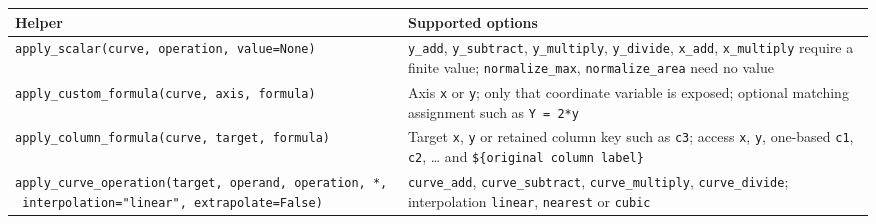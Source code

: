 \documentclass[
  10pt,
  a4paper,
  oneside]{scrreprt}
\begin{document}
\begin{longtable}[]{@{}ll@{}}
\toprule
\begin{minipage}[b]{0.47\columnwidth}\raggedright
Helper\strut
\end{minipage} & \begin{minipage}[b]{0.47\columnwidth}\raggedright
Supported options\strut
\end{minipage}\tabularnewline
\midrule
\endhead
\begin{minipage}[t]{0.47\columnwidth}\raggedright
\texttt{apply\_scalar(curve,\ operation,\ value=None)}\strut
\end{minipage} & \begin{minipage}[t]{0.47\columnwidth}\raggedright
\texttt{y\_add}, \texttt{y\_subtract}, \texttt{y\_multiply},
\texttt{y\_divide}, \texttt{x\_add}, \texttt{x\_multiply} require a
finite value; \texttt{normalize\_max}, \texttt{normalize\_area} need no
value\strut
\end{minipage}\tabularnewline
\begin{minipage}[t]{0.47\columnwidth}\raggedright
\texttt{apply\_custom\_formula(curve,\ axis,\ formula)}\strut
\end{minipage} & \begin{minipage}[t]{0.47\columnwidth}\raggedright
Axis \texttt{x} or \texttt{y}; only that coordinate variable is exposed;
optional matching assignment such as \texttt{Y\ =\ 2*y}\strut
\end{minipage}\tabularnewline
\begin{minipage}[t]{0.47\columnwidth}\raggedright
\texttt{apply\_column\_formula(curve,\ target,\ formula)}\strut
\end{minipage} & \begin{minipage}[t]{0.47\columnwidth}\raggedright
Target \texttt{x}, \texttt{y} or retained column key such as
\texttt{c3}; access \texttt{x}, \texttt{y}, one-based \texttt{c1},
\texttt{c2}, \ldots{} and \texttt{\$\{original\ column\ label\}}\strut
\end{minipage}\tabularnewline
\begin{minipage}[t]{0.47\columnwidth}\raggedright
\texttt{apply\_curve\_operation(target,\ operand,\ operation,\ *,\ interpolation="linear",\ extrapolate=False)}\strut
\end{minipage} & \begin{minipage}[t]{0.47\columnwidth}\raggedright
\texttt{curve\_add}, \texttt{curve\_subtract}, \texttt{curve\_multiply},
\texttt{curve\_divide}; interpolation \texttt{linear}, \texttt{nearest}
or \texttt{cubic}\strut

\end{minipage}
\end{longtable}
\end{document}
